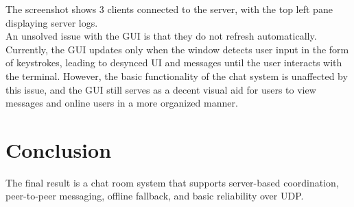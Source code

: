 \documentclass[11pt]{article}
\begin{document}
The screenshot shows 3 clients connected to the server, with the top left pane displaying server logs. \\

An unsolved issue with the GUI is that they do not refresh automatically. 
Currently, the GUI updates only when the window detects user input in the form of keystrokes, 
leading to desynced UI and messages until the user interacts with the terminal.
However, the basic functionality of the chat system is unaffected by this issue, 
and the GUI still serves as a decent visual aid 
for users to view messages and online users in a more organized manner.

\section{Conclusion}

The final result is a chat room system that supports server-based coordination, 
peer-to-peer messaging, offline fallback, and basic reliability over UDP. 
\end{document}

